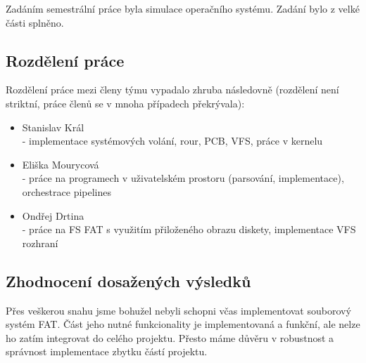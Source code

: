 \documentclass[12pt, a4paper]{article}
\begin{document}
Zadáním semestrální práce byla simulace operačního systému. Zadání bylo z velké části splněno.

\subsection{Rozdělení práce}

Rozdělení práce mezi členy týmu vypadalo zhruba následovně (rozdělení není striktní, práce členů se v mnoha případech překrývala):

\begin{itemize}
	\item Stanislav Král \\
		- implementace systémových volání, rour, PCB, VFS, práce v kernelu
	\item Eliška Mourycová \\
		- práce na programech v uživatelském prostoru (parsování, implementace), orchestrace pipelines
	\item Ondřej Drtina \\
		- práce na FS FAT s využitím přiloženého obrazu diskety, implementace VFS rozhraní
\end{itemize}

\subsection{Zhodnocení dosažených výsledků}
Přes veškerou snahu jsme bohužel nebyli schopni včas implementovat souborový systém FAT. Část jeho nutné funkcionality je implementovaná a funkční, ale nelze ho zatím integrovat do celého projektu. Přesto máme důvěru v robustnost a správnost implementace zbytku částí projektu.
\end{document}
